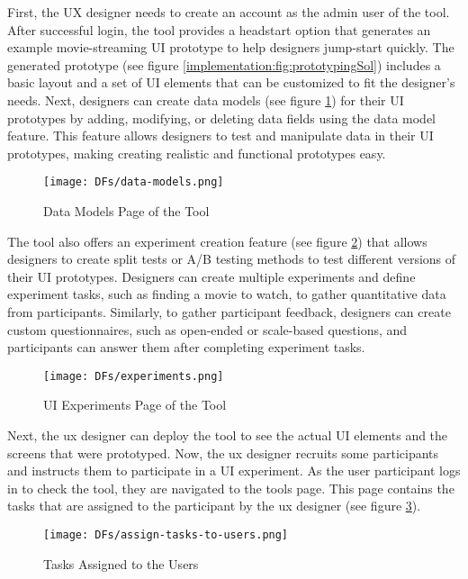 First, the UX designer needs to create an account as the admin user of the tool. After successful login, the tool provides a headstart option that generates an example movie-streaming UI prototype to help designers jump-start quickly. 
The generated prototype (see figure \ref{implementation:fig:prototypingSol}) includes a basic layout and a set of UI elements that can be customized to fit the designer's needs.
Next, designers can create data models (see figure \ref{implementation:fig:datamodels}) for their UI prototypes by adding, modifying, or deleting data fields using the data model feature. 
This feature allows designers to test and manipulate data in their UI prototypes, making creating realistic and functional prototypes easy.
\begin{figure}[ht]
    \centering
    \texttt{[image: DFs/data-models.png]}
    \caption{Data Models Page of the Tool}
    \label{implementation:fig:datamodels}
\end{figure}
The tool also offers an experiment creation feature (see figure \ref{implementation:fig:experiments}) that allows designers to create split tests or A/B testing methods to test different versions of their UI prototypes. 
Designers can create multiple experiments and define experiment tasks, such as finding a movie to watch, to gather quantitative data from participants.
Similarly, to gather participant feedback, designers can create custom questionnaires, such as open-ended or scale-based questions, and participants can answer them after completing experiment tasks.
\begin{figure}[ht]
    \centering
    \texttt{[image: DFs/experiments.png]}
    \caption{UI Experiments Page of the Tool}
    \label{implementation:fig:experiments}
\end{figure}

Next, the \ac{ux} designer can deploy the tool to see the actual UI elements and the screens that were prototyped.
Now, the \ac{ux} designer recruits some participants and instructs them to participate in a UI experiment.
As the user participant logs in to check the tool, they are navigated to the tools page. 
This page contains the tasks that are assigned to the participant by the \ac{ux} designer (see figure \ref{implementation:fig:user-tasks}).
\clearpage
\begin{figure}[ht]
    \centering
    \texttt{[image: DFs/assign-tasks-to-users.png]}
    \caption{Tasks Assigned to the Users}
    \label{implementation:fig:user-tasks}
\end{figure}

